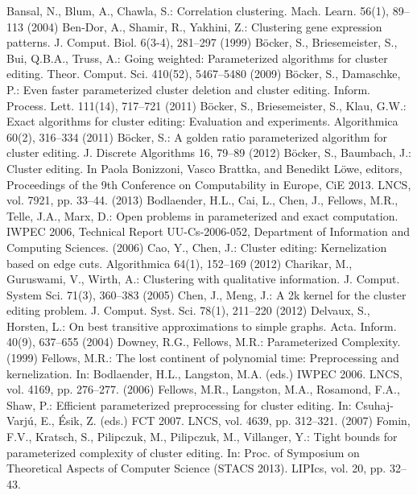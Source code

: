 \documentclass[10.5,a4paper,titlepage, dvipdfmx]{bxjsarticle}
\begin{document}
\begin{thebibliography}{}
    \bibitem{} Bansal, N., Blum, A., Chawla, S.: Correlation clustering. Mach. Learn. 56(1),
    89--113 (2004)
    \bibitem{} Ben-Dor, A., Shamir, R., Yakhini, Z.: Clustering gene expression patterns. J.
    Comput. Biol. 6(3-4), 281--297 (1999)
    \bibitem{} Böcker, S., Briesemeister, S., Bui, Q.B.A., Truss, A.: Going weighted: Parameterized algorithms for cluster editing. Theor. Comput. Sci. 410(52), 5467--5480 (2009)
    \bibitem{} Böcker, S., Damaschke, P.: Even faster parameterized cluster deletion and cluster
    editing. Inform. Process. Lett. 111(14), 717--721 (2011)
    \bibitem{} Böcker, S., Briesemeister, S., Klau, G.W.: Exact algorithms for cluster editing:
    Evaluation and experiments. Algorithmica 60(2), 316--334 (2011)
    \bibitem{} Böcker, S.: A golden ratio parameterized algorithm for cluster editing. J. Discrete
    Algorithms 16, 79--89 (2012)
    \bibitem{} Böcker, S., Baumbach, J.: Cluster editing. In Paola Bonizzoni, Vasco Brattka, and
    Benedikt Löwe, editors, Proceedings of the 9th Conference on Computability in Europe, CiE 2013. LNCS, vol. 7921, pp. 33--44. (2013)
    \bibitem{} Bodlaender, H.L., Cai, L., Chen, J., Fellows, M.R., Telle, J.A., Marx, D.: Open problems in parameterized and exact computation. IWPEC 2006,
    Technical Report UU-Cs-2006-052, Department of Information and Computing Sciences. (2006)
    \bibitem{} Cao, Y., Chen, J.: Cluster editing: Kernelization based on edge cuts. Algorithmica
    64(1), 152--169 (2012)
    \bibitem{} Charikar, M., Guruswami, V., Wirth, A.: Clustering with qualitative information.
    J. Comput. System Sci. 71(3), 360--383 (2005)
    \bibitem{} Chen, J., Meng, J.: A 2k kernel for the cluster editing problem. J. Comput. Syst.
    Sci. 78(1), 211--220 (2012)
    \bibitem{} Delvaux, S., Horsten, L.: On best transitive approximations to simple graphs. Acta.
    Inform. 40(9), 637--655 (2004)
    \bibitem{} Downey, R.G., Fellows, M.R.: Parameterized Complexity. (1999)
    \bibitem{} Fellows, M.R.: The lost continent of polynomial time: Preprocessing and kernelization. In: Bodlaender, H.L., Langston, M.A. (eds.) IWPEC 2006. LNCS, vol. 4169,
    pp. 276--277. (2006)
    \bibitem{} Fellows, M.R., Langston, M.A., Rosamond, F.A., Shaw, P.: Efficient parameterized
    preprocessing for cluster editing. In: Csuhaj-Varjú, E., Ésik, Z. (eds.) FCT 2007.
    LNCS, vol. 4639, pp. 312--321. (2007)
    \bibitem{} Fomin, F.V., Kratsch, S., Pilipczuk, M., Pilipczuk, M., Villanger, Y.: Tight bounds
    for parameterized complexity of cluster editing. In: Proc. of Symposium on Theoretical Aspects of Computer Science (STACS 2013). LIPIcs, vol. 20, pp. 32--43.

\end{thebibliography}
\end{document}
